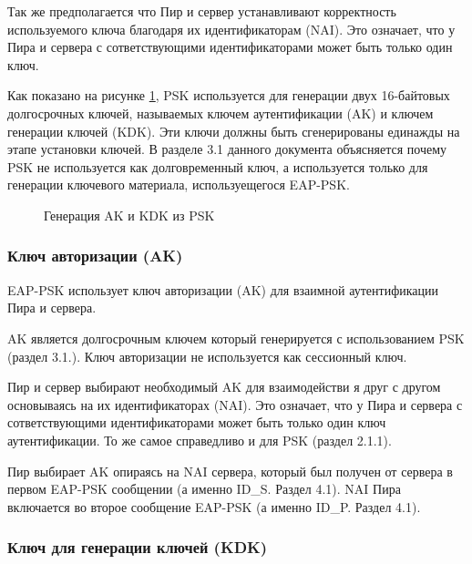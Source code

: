 Так же предполагается что Пир и сервер устанавливают корректность используемого ключа благодаря их идентификаторам (NAI). Это означает, что у Пира и сервера с сответствующими идентификаторами может быть только один ключ.

Как показано на рисунке \ref{img:ak_kdk_psk}, PSK используется для генерации двух 16-байтовых долгосрочных ключей, называемых ключем аутентификации (AK) и ключем генерации ключей (KDK). Эти ключи должны быть сгенерированы единажды на этапе установки ключей. В разделе 3.1 данного документа объясняется почему PSK не используется как долговременный ключ, а используется только для генерации ключевого материала, используещегося EAP-PSK.

\begin{figure}[h!]
\caption{Генерация AK и KDK из PSK}
\label{img:ak_kdk_psk}
\end{figure}

\subsubsection{Ключ авторизации (AK)}

EAP-PSK использует ключ авторизации (AK) для взаимной аутентификации Пира и сервера. 

AK является долгосрочным ключем который генерируется с использованием PSK (раздел 3.1.). Ключ авторизации не используется как сессионный ключ.

Пир и сервер выбирают необходимый AK для взаимодействи я друг с другом основываясь на их идентификаторах (NAI). Это означает, что у Пира и сервера с сответствующими идентификаторами может быть только один ключ аутентификации. То же самое справедливо и для PSK (раздел 2.1.1).

Пир выбирает AK опираясь на NAI сервера, который был получен от сервера в первом EAP-PSK сообщении (а именно ID\_S. Раздел 4.1). NAI Пира включается во второе сообщение EAP-PSK (а именно ID\_P. Раздел 4.1).

\subsubsection{Ключ для генерации ключей (KDK)}
